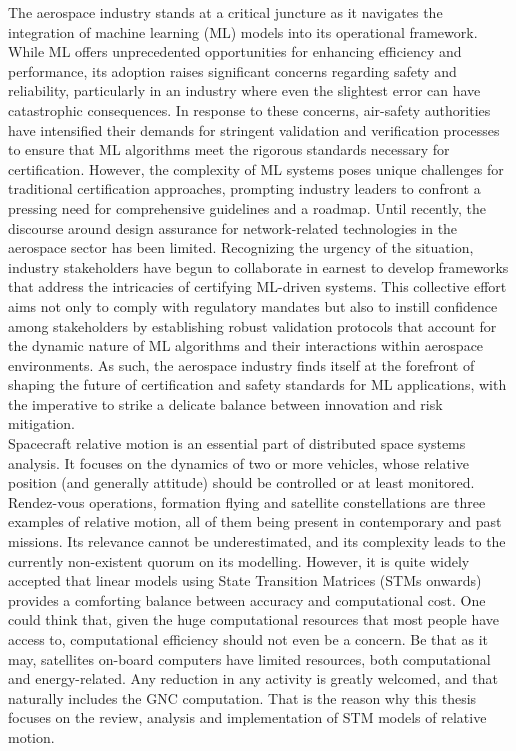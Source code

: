 \indent The aerospace industry stands at a critical juncture as it navigates the integration of machine learning (ML) models into its operational framework. While ML offers unprecedented opportunities for enhancing efficiency and performance, its adoption raises significant concerns regarding safety and reliability, particularly in an industry where even the slightest error can have catastrophic consequences. In response to these concerns, air-safety authorities have intensified their demands for stringent validation and verification processes to ensure that ML algorithms meet the rigorous standards necessary for certification. However, the complexity of ML systems poses unique challenges for traditional certification approaches, prompting industry leaders to confront a pressing need for comprehensive guidelines and a roadmap. Until recently, the discourse around design assurance for network-related technologies in the aerospace sector has been limited. Recognizing the urgency of the situation, industry stakeholders have begun to collaborate in earnest to develop frameworks that address the intricacies of certifying ML-driven systems. This collective effort aims not only to comply with regulatory mandates but also to instill confidence among stakeholders by establishing robust validation protocols that account for the dynamic nature of ML algorithms and their interactions within aerospace environments. As such, the aerospace industry finds itself at the forefront of shaping the future of certification and safety standards for ML applications, with the imperative to strike a delicate balance between innovation and risk mitigation.\\
%
\indent Spacecraft relative motion is an essential part of distributed space systems analysis. It focuses on the dynamics of two or more vehicles, whose relative position (and generally attitude) should be controlled or at least monitored. Rendez-vous operations, formation flying and satellite constellations are three examples of relative motion, all of them being present in contemporary and past missions. Its relevance cannot be underestimated, and its complexity leads to the currently non-existent quorum on its modelling. However, it is quite widely accepted that linear models using State Transition Matrices (\ie STMs onwards) provides a comforting balance between accuracy and computational cost. One could think that, given the huge computational resources that most people have access to, computational efficiency should not even be a concern. Be that as it may, satellites on-board computers have limited resources, both computational and energy-related. Any reduction in any activity is greatly welcomed, and that naturally includes the GNC computation. That is the reason why this thesis focuses on the review, analysis and implementation of STM models of relative motion.\\
